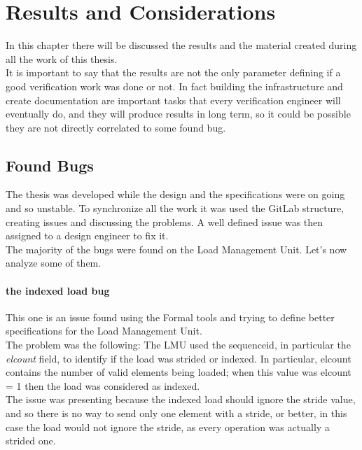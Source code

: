 \chapter{Results and Considerations}
In this chapter there will be discussed the results and the material created during all the work of this thesis.\\

It is important to say that the results are not the only parameter defining if a good verification work was done or not. In fact building the infrastructure and create documentation are important tasks that every verification engineer will eventually do, and they will produce results in long term, so it could be possible they are not directly correlated to some found bug.\\


\section{Found Bugs}
The thesis was developed while the design and the specifications were on going and so unstable. To synchronize all the work it was used the GitLab structure, creating issues and discussing the problems. A well defined issue was then assigned to a design engineer to fix it.\\

The majority of the bugs were found on the Load Management Unit. Let's now analyze some of them.\\

\subsubsection{the indexed load bug}
This one is an issue found using the Formal tools and trying to define better specifications for the Load Management Unit.\\

The problem was the following:
The LMU used the sequence\+id, in particular the \emph{el\+count} field, to identify if the load was strided or indexed. In particular, el\+count contains the number of valid elements being loaded; when this value was el\+count = 1 then the load was considered as indexed.\\
The issue was presenting because the indexed load should ignore the stride value, and so there is no way to send only one element with a stride, or better, in this case the load would not ignore the stride, as every operation was actually a strided one.\\


